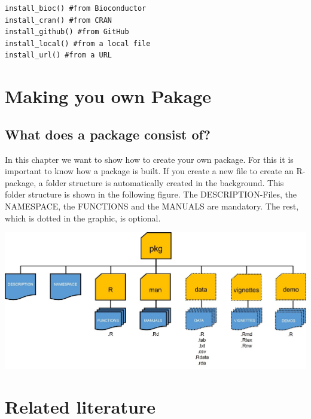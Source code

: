 \documentclass[a4paper,11pt]{article}
\begin{document}
\begin{lstlisting}[frame=single]
install_bioc() #from Bioconductor
install_cran() #from CRAN
install_github() #from GitHub
install_local() #from a local file
install_url() #from a URL
\end{lstlisting}

\section{Making you own Pakage}
\subsection{What does a package consist of?}
In this chapter we want to show how to create your own package. For this it is important to know how a package is built. If you create a new file to create an R-package, a folder structure is automatically created in the background. This folder structure is shown in the following figure. The DESCRIPTION-Files, the NAMESPACE, the FUNCTIONS and the MANUALS are mandatory. The rest, which is dotted in the graphic, is optional.
\\
\begin{center}
	\includegraphics[width=1\linewidth]{stott}
\end{center}  




\section{Related literature}


\begin{thebibliography}{laengste Labelbreite}
\end{thebibliography}
\end{document}

